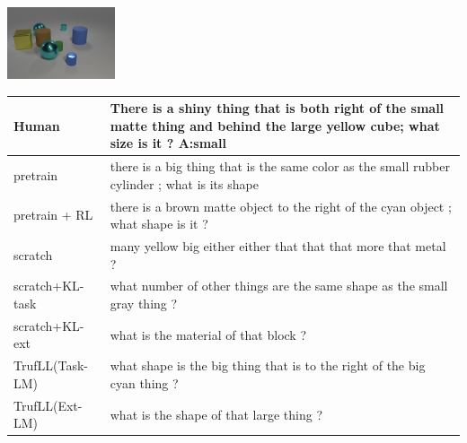 \documentclass{article}
\newcommand{\algo}{TrufLL\xspace}
\begin{document}
\begin{table}[t!]
	
  \begin{minipage}{0.2\linewidth}
        \includegraphics[width=120px]{./CLEVR_val_004957.png}
	\end{minipage}
	\hspace{1.2cm}
	\begin{minipage}{0.80\linewidth}
		\scriptsize
		\begin{tabular}{ll}
			Human           & There is a shiny thing that is both right of the small matte thing and behind the large yellow cube; what size is it ? \quad \textbf{A:small} \\
			\midrule
			pretrain        & there is a big thing that is the same color as the small rubber cylinder ; what is its shape \\
		    pretrain + RL   & there is a brown matte object to the right of the cyan object ; what shape is it ? \\ \midrule
			scratch         & many yellow big either either that that that more that metal ?  \\
			scratch+KL-task & what number of other things are the same shape as the small gray thing ? \\
			scratch+KL-ext  & what is the material of that block ?\\ \midrule
			\algo(Task-LM) & what shape is the big thing that is to the right of the big cyan thing ? \\
			\algo(Ext-LM)   & what is the shape of that large thing ? \\
			\bottomrule
		\end{tabular}
	\end{minipage}
	\vspace{1mm}



\end{table}
\end{document}
